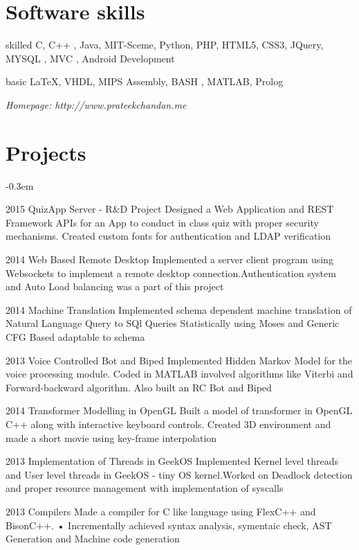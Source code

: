 \documentclass[fontsize=10pt]{tccv}
\begin{document}
\vspace{-9mm}
\section{Software skills}
\begin{factlist}

\item{skilled}
     {C, C++ , Java, MIT-Sceme, Python, PHP, HTML5, CSS3, JQuery, MYSQL , MVC , Android Development}

\item{basic}
     {\LaTeX , VHDL, MIPS Assembly, BASH , MATLAB, Prolog}

\end{factlist}

\textit{Homepage: http://www.prateekchandan.me}
\section{Projects}

\begin{yearlist}
\itemsep -0.3em
\item{2015}
     {QuizApp Server - R\&D Project}
     {Designed a Web Application and REST Framework APIs for an App to conduct in class quiz with proper security mechanisms. Created custom fonts for authentication and LDAP verification
     }

\item{2014}
     {Web Based Remote Desktop}
     {Implemented a server client program using Websockets to implement a remote desktop connection.Authentication system and Auto Load balancing was a part of this project
     }

\item{2014}
     {Machine Translation }
     {Implemented schema dependent machine translation of Natural Language Query to SQl Queries Statistically using Moses and Generic CFG Based adaptable to schema
     }
     
\item{2013}
     {Voice Controlled Bot and Biped}
     {Implemented Hidden Markov Model for the voice processing module. Coded in MATLAB involved algorithms like Viterbi and Forward-backward algorithm. Also built an RC Bot and Biped
     }

\item{2014}
     {Transformer Modelling in OpenGL}
     {Built a model of transformer in OpenGL C++ along with interactive keyboard controls. Created 3D environment and made a short movie using key-frame interpolation
     }

\item{2013}
     {Implementation of Threads in GeekOS}
     {Implemented Kernel level threads and User level threads in GeekOS - tiny OS kernel.Worked on Deadlock detection and proper resource management with implementation of syscalls
     }

\item{2013}
     {Compilers}
     {Made a compiler for C like language using FlexC++ and BisonC++. • Incrementally achieved syntax analysis, symentaic check, AST Generation and Machine code generation
     }
\end{yearlist}
\end{document}
